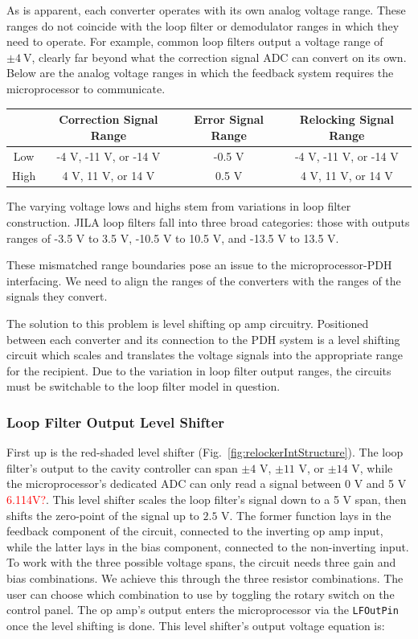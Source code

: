 \documentclass[10pt]{report}
\newcommand{\LFOutPin}[0] {\texttt{LFOutPin}}
\begin{document}
As is apparent, each converter operates with its own analog voltage range. These ranges do not coincide with the loop filter or demodulator ranges in which they need to operate. For example, common loop filters output a voltage range of $\pm4~\text{V}$, clearly far beyond what the correction signal ADC can convert on its own. Below are the analog voltage ranges in which the feedback system requires the microprocessor to communicate.

\begin{center}
\begin{tabular}{ c||c||c||c }
& Correction Signal Range & Error Signal Range & Relocking Signal Range \\
\hline
Low & -4 V, -11 V, or -14 V & -0.5 V & -4 V, -11 V, or -14 V \\
\hline
High & 4 V, 11 V, or 14 V & 0.5 V & 4 V, 11 V, or 14 V \\
\end{tabular}
\end{center}

The varying voltage lows and highs stem from variations in loop filter construction. JILA loop filters fall into three broad categories: those with outputs ranges of -3.5 V to 3.5 V, -10.5 V to 10.5 V, and -13.5 V to 13.5 V. 

These mismatched range boundaries pose an issue to the microprocessor-PDH interfacing. We need to align the ranges of the converters with the ranges of the signals they convert.

The solution to this problem is level shifting op amp circuitry. Positioned between each converter and its connection to the PDH system is a level shifting circuit which scales and translates the voltage signals into the appropriate range for the recipient. Due to the variation in loop filter output ranges, the circuits must be switchable to the loop filter model in question.

\subsubsection{Loop Filter Output Level Shifter}

First up is the red-shaded level shifter (Fig.~\ref{fig:relockerIntStructure}). The loop filter's output to the cavity controller can span $\pm4$ V, $\pm11$ V, or $\pm14$ V, while the microprocessor's dedicated ADC can only read a signal between 0 V and 5 V \textcolor{red}{6.114V?}. This level shifter scales the loop filter's signal down to a 5 V span, then shifts the zero-point of the signal up to $2.5$ V. The former function lays in the feedback component of the circuit, connected to the inverting op amp input, while the latter lays in the bias component, connected to the non-inverting input. To work with the three possible voltage spans, the circuit needs three gain and bias combinations. We achieve this through the three resistor combinations. The user can choose which combination to use by toggling the rotary switch on the control panel. The op amp's output enters the microprocessor via the \LFOutPin{} once the level shifting is done. This level shifter's output voltage equation is:
\end{document}
